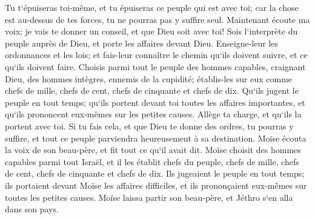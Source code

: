 \verse Tu t`épuiseras toi-même, et tu épuiseras ce peuple qui est avec toi; car la chose est au-dessus de tes forces, tu ne pourras pas y suffire seul. 
\verse Maintenant écoute ma voix; je vais te donner un conseil, et que Dieu soit avec toi! Sois l`interprète du peuple auprès de Dieu, et porte les affaires devant Dieu. 
\verse Enseigne-leur les ordonnances et les lois; et fais-leur connaître le chemin qu`ils doivent suivre, et ce qu`ils doivent faire. 
\verse Choisis parmi tout le peuple des hommes capables, craignant Dieu, des hommes intègres, ennemis de la cupidité; établis-les sur eux comme chefs de mille, chefs de cent, chefs de cinquante et chefs de dix. 
\verse Qu`ils jugent le peuple en tout temps; qu`ils portent devant toi toutes les affaires importantes, et qu`ils prononcent eux-mêmes sur les petites causes. Allège ta charge, et qu`ils la portent avec toi. 
\verse Si tu fais cela, et que Dieu te donne des ordres, tu pourras y suffire, et tout ce peuple parviendra heureusement à sa destination. 
\verse Moïse écouta la voix de son beau-père, et fit tout ce qu`il avait dit. 
\verse Moïse choisit des hommes capables parmi tout Israël, et il les établit chefs du peuple, chefs de mille, chefs de cent, chefs de cinquante et chefs de dix. 
\verse Ils jugeaient le peuple en tout temps; ils portaient devant Moïse les affaires difficiles, et ils prononçaient eux-mêmes sur toutes les petites causes. 
\verse Moïse laissa partir son beau-père, et Jéthro s`en alla dans son pays. 

\chapter{}

